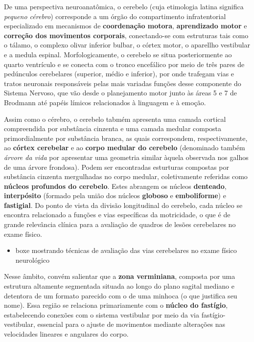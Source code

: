 \documentclass[
]{book}
\providecommand{\tightlist}{%
  \setlength{\itemsep}{0pt}\setlength{\parskip}{0pt}}
\theoremstyle{definition}
\theoremstyle{definition}
\theoremstyle{definition}
\theoremstyle{definition}
\theoremstyle{remark}
\begin{document}
De uma perspectiva neuroanatômica, o cerebelo (cuja etimologia latina significa \emph{pequeno cérebro}) corresponde a um órgão do compartimento infratentorial especializado em mecanismos de \textbf{coordenação motora}, \textbf{aprendizado motor} e \textbf{correção dos movimentos corporais}, conectando-se com estruturas tais como o tálamo, o complexo olivar inferior bulbar, o córtex motor, o aparellho vestibular e a medula espinal. Morfologicamente, o cerebelo se situa posteriormente ao quarto ventrículo e se conecta com o tronco encefálico por meio de três pares de pedúnculos cerebelares (superior, médio e inferior), por onde trafegam vias e tratos neuronais responsáveis pelas mais variadas funções desse componente do Sistema Nervoso, que vão desde o planejamento motor junto às áreas 5 e 7 de Brodmann até papéis límicos relacionados à linguagem e à emoção.

Assim como o cérebro, o cerebelo tabmém apresenta uma camada cortical compreendida por substância cinzenta e uma camada medular composta primordialmente por substância branca, as quais correspondem, respectivamente, ao \textbf{córtex cerebelar} e ao \textbf{corpo medular do cerebelo} (denominado também \emph{árvore da vida} por apresentar uma geometria similar àquela observada nos galhos de uma árvore frondosa). Podem ser encontradas esturturas compostas por substância cinzenta mergulhadas no corpo medular, coletivamente referidas como \textbf{núcleos profundos do cerebelo}. Estes abrangem os núcleos \textbf{denteado}, \textbf{interpósito} (formado pela união dos núcleos \textbf{globoso} e \textbf{emboliforme}) e \textbf{fastigial}. Do ponto de vista da divisão longitudinal do cerebelo, cada núcleo se encontra relacionado a funções e vias específicas da motricidade, o que é de grande relevância clínica para a avaliação de quadros de lesões cerebelares no exame físico.

\begin{itemize}
\tightlist
\item
  boxe mostrando técnicas de avaliação das vias cerebelares no exame físico neurológico
\end{itemize}

Nesse âmbito, convém salientar que a \textbf{zona verminiana}, composta por uma estrutura altamente segmentada situada ao longo do plano sagital mediano e detentora de um formato parecido com o de uma minhoca (o que justifica seu nome). Essa região se relaciona primariamente com o \textbf{núcleo do fastígio}, estabelecendo conexões com o sistema vestibular por meio da via fastígio-vestibular, essencial para o ajuste de movimentos mediante alterações nas velocidades lineares e angulares do corpo.
\end{document}
